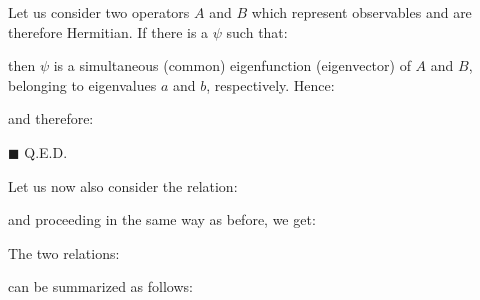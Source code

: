 	\begin{dem}
	Let us consider two operators $A$ and $B$ which represent observables and are therefore Hermitian. If there is a $\psi$ such that:
	
	then $\psi$ is a simultaneous (common) eigenfunction (eigenvector) of $A$ and $B$, belonging to eigenvalues $a$ and $b$, respectively. Hence:
	
	and therefore:
	
	\begin{flushright}
		$\blacksquare$  Q.E.D.
	\end{flushright}
	\end{dem}
	Let us now also consider the relation:
	
	and proceeding in the same way as before, we get:
	
	The two relations:
	
	can be summarized as follows:
	
